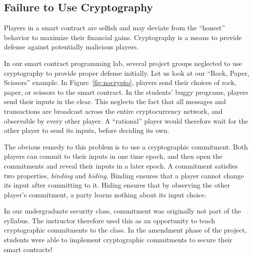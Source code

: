 \documentclass[10pt,twocolumn,letterpaper]{article}
\newcommand{\elaine}[1]{{\color{red}{[elaine: #1]}}}
\newcommand{\ignore}[1]{}
\begin{document}
\ignore{
So how do we fix these issues? It seems like our contract needs the ability to give refunds to users who try to sign up too late. Think about how you would do this. Go ahead and try it and see if your idea works! Are there any other edge cases where issuing a refund should be considered? Look at the section "Sending Wei" in the Serpent Tutorial for inspiration.
}

\subsection{Failure to Use Cryptography}
Players in a smart contract are selfish and  
may deviate from the ``honest'' behavior
to maximize their financial gains.
Cryptography is a means to provide 
defense against potentially malicious players.

In our smart contract programming lab, 
several project groups
neglected to use cryptography 
to provide proper defense initially.
Let us look at our ``Rock, Paper, Scissors'' example.
In Figure~\ref{fig:nocrypto}, players send their
choices of rock, paper, or scissors  
to the smart contract.
In the students' buggy programs, players
send their inputs in the clear.  
This neglects the fact that all messages and transactions
are broadcast 
across the entire cryptocurrency network, and observable
by every other player. 
A ``rational'' player would therefore wait
for the other player to send its inputs, before
deciding its own.


The obvious remedy to this problem is to use
a cryptographic commitment.
Both players can commit to their inputs in one time epoch,
and then open the commitments and reveal their inputs in a later epoch. 
A commitment satisfies two properties, {\it binding} and {\it hiding}.
Binding ensures that a player cannot change its input
after committing to it. Hiding ensures
that by observing the other player's commitment, a party learns
nothing about its input choice.  

In our undergraduate security class, commitment was originally not
part of the syllabus. The instructor
therefore used this as an opportunity to teach cryptographic commitments
to the class.
In the amendment phase of the project,
students were able to implement cryptographic commitments
to secure their smart contracts!

\ignore{
Cryptography is often the first line of defense against security hazards in smart contract programming. In the example above, players reveal too much plaintext information, which can be used by an attacker to spoil the game. In the section, we'll describe how to apply cryptographic commitments to fix this problem.

In our RPS contract the user is using a numeric scale as their input with 0: rock, 1: paper, 2: scissors. Let's take a look at the function that registers their inputs and think about possible vulnerabilities:
}
\end{document}
